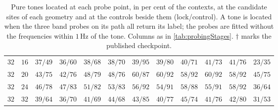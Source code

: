 \begin{table}[!tbp]
\begin{tabular}{@{}cccccccccccc@{}}
        $32$ & $16$ & $37/49$ & $36/60$ & $38/68$ & $38/70$ & $39/95$ & $39/80$ & $40/71$ & $41/73$ & $41/76$ & $23/35$ \\
        $32$ & $20$ & $43/75$ & $42/76$ & $48/79$ & $48/76$ & $60/87$ & $60/92$ & $58/92$ & $60/92$ & $58/92$ & $45/75$ \\
        $32$ & $24$ & $46/78$ & $47/83$ & $51/82$ & $53/83$ & $56/92$ & $54/91$ & $58/88$ & $55/91$ & $58/92$ & $36/64$ \\
        $32$ & $32$ & $39/64$ & $36/70$ & $41/69$ & $44/68$ & $43/85$ & $40/77$ & $45/74$ & $41/76$ & $42/80$ & $31/53$ \\
        \bottomrule
    \end{tabular}
    \caption{Pure tones located at each probe point, in per cent of the contexts, at the candidate sites of each geometry and at the controls beside them (lock/control). A tone is located when the three band probes on its path all return its label; the probes are fitted without the frequencies within $1$\,Hz of the tone. Columns as in \autoref{tab:probingStages}. $\dagger$ marks the published checkpoint.}
    \label{tab:probingLockControl}
\end{table}

